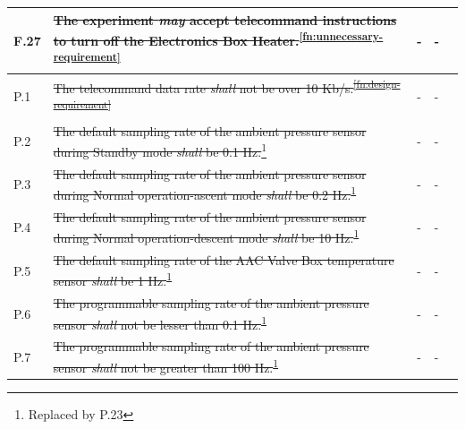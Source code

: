 \documentclass[a4paper,12pt,twoside]{article}
\providecommand{\DIFaddtex}[1]{{\protect\color{blue}\uwave{#1}}} %
\providecommand{\DIFdeltex}[1]{{\protect\color{red}\sout{#1}}}                      %
\providecommand{\DIFaddbegin}{} %
\providecommand{\DIFaddend}{} %
\providecommand{\DIFdelbegin}{} %
\providecommand{\DIFdelend}{} %
\providecommand{\DIFadd}[1]{\texorpdfstring{\DIFaddtex{#1}}{#1}} %
\providecommand{\DIFdel}[1]{\texorpdfstring{\DIFdeltex{#1}}{}} %
\newcommand{\DIFscaledelfig}{0.5}
\newlength{\DIFdelgraphicswidth} %
\newlength{\DIFdelgraphicsheight} %
\newcommand{\DIFaddincludegraphics}[2][]{{\color{blue}\fbox{\DIFOincludegraphics[#1]{#2}}}} %
\newcommand{\DIFdelincludegraphics}[2][]{%
\sbox{\DIFdelgraphicsbox}{\DIFOincludegraphics[#1]{#2}}%
\settoboxwidth{\DIFdelgraphicswidth}{\DIFdelgraphicsbox} %
\settoboxtotalheight{\DIFdelgraphicsheight}{\DIFdelgraphicsbox} %
\scalebox{\DIFscaledelfig}{%
\parbox[b]{\DIFdelgraphicswidth}{\usebox{\DIFdelgraphicsbox}\\[-\baselineskip] \rule{\DIFdelgraphicswidth}{0em}}\llap{\resizebox{\DIFdelgraphicswidth}{\DIFdelgraphicsheight}{%
\setlength{\unitlength}{\DIFdelgraphicswidth}%
\begin{picture}(1,1)%
\thicklines\linethickness{2pt} %
{\color[rgb]{1,0,0}\put(0,0){\framebox(1,1){}}}%
{\color[rgb]{1,0,0}\put(0,0){\line( 1,1){1}}}%
{\color[rgb]{1,0,0}\put(0,1){\line(1,-1){1}}}%
\end{picture}%
}\hspace*{3pt}}} %
} %
\DeclareRobustCommand{\DIFaddbegin}{\DIFOaddbegin \let\includegraphics\DIFaddincludegraphics} %
\DeclareRobustCommand{\DIFaddend}{\DIFOaddend \let\includegraphics\DIFOincludegraphics} %
\DeclareRobustCommand{\DIFdelbegin}{\DIFOdelbegin \let\includegraphics\DIFdelincludegraphics} %
\DeclareRobustCommand{\DIFdelend}{\DIFOaddend \let\includegraphics\DIFOincludegraphics} %
\begin{document}
\begin{longtable}[]{|m{}| m{} |m{} |m{}|m{}|}
F.27 & \st{The experiment \textit{may} accept telecommand instructions to turn off the Electronics Box Heater.}\textsuperscript{\ref{fn:unnecessary-requirement}}                                                                                    &      -        & -            &        \\ \hline
P.1  & \DIFdelbegin %
\DIFdelend \DIFaddbegin \st{The telecommand data rate \textit{shall} not be over 10 Kb/s.}\DIFaddend \textsuperscript{\DIFdelbegin \DIFdel{\ref{fn:design-requirement}}\DIFdelend \DIFaddbegin \DIFadd{\ref{designRequirement}}\DIFaddend }                                                                                                                           &        -      & -          &        \\ \hline
P.2  & \st{The default sampling rate of the ambient pressure sensor during Standby mode \textit{shall} be 0.1 Hz.}\footnote{Replaced by P.23\label{replaceSoftVeri}}                                                                       &      -  & -  &        \\ \hline
P.3  & \st{The default sampling rate of the ambient pressure sensor during Normal operation-ascent mode \textit{shall} be 0.2 Hz.}\textsuperscript{\ref{replaceSoftVeri}}                                                           &    -        & -        &        \\ \hline
P.4  & \st{The default sampling rate of the ambient pressure sensor during Normal operation-descent mode \textit{shall} be 10 Hz.}\textsuperscript{\ref{replaceSoftVeri}}                                                           &   -     & -    &        \\ \hline
P.5  & \st{The default sampling rate of the AAC Valve Box temperature sensor \textit{shall} be 1 Hz.}\textsuperscript{\ref{replaceSoftVeri}}                                                                                        &     -        &  -            &        \\ \hline
P.6  &\st{ The programmable sampling rate of the ambient pressure sensor \textit{shall} not be lesser than 0.1 Hz.}\textsuperscript{\ref{replaceSoftVeri}}                                                                          &      -    & -            &        \\ \hline
P.7  & \st{The programmable sampling rate of the ambient pressure sensor \textit{shall} not be greater than 100 Hz.}\textsuperscript{\ref{replaceSoftVeri}}                                                                         &       -     & -           &        \\ \hline

\end{longtable}
\end{document}
